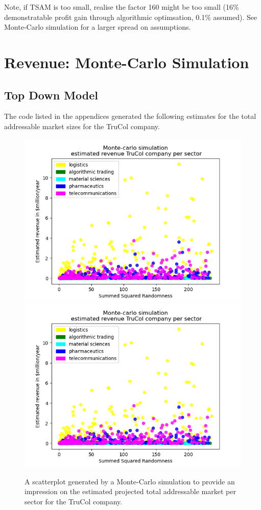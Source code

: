 Note, if TSAM is too small, realise the factor 160 might be too small (16\% demonstratable profit gain through algorithmic optimsation, 0.1\% assumed). See Monte-Carlo simulation for a larger spread on assumptions.

\section{Revenue: Monte-Carlo Simulation}\label{sec:results}
\subsection{Top Down Model}\label{subsec:results_top_down}
The code listed in the appendices generated the following estimates for the total addressable market sizes for the TruCol company.
\begin{figure}[H]
    \centering
    \ifx\homepath\overleafhome
		\includegraphics[width=0.5\linewidth]{Images/revenue_per_sector.png}
	\else
    \includegraphics[width=0.5\linewidth]{latex/Images/revenue_per_sector.png}
	\fi

    \caption{A scatterplot generated by a Monte-Carlo simulation to provide an impression on the estimated projected total addressable market per sector for the TruCol company.}
    \label{fig:per_sector}
\end{figure}

